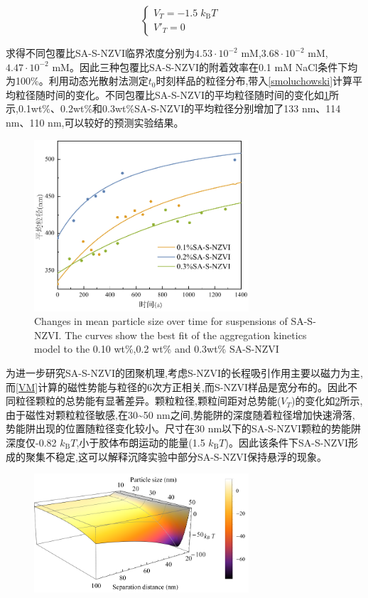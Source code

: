 \begin{equation}
    \left\{
        \begin{array}{lcl} 
            V_T=-1.5\; k_\mathrm{B}T& \\
            V'_T=0 &
        \end{array}\right.
\end{equation}

求得不同包覆比SA-S-NZVI临界浓度分别为$4.53\cdot10^{-2}$ mM,$3.68\cdot10^{-2}$ mM,$4.47 \cdot 10^{-2}$ mM。因此三种包覆比SA-S-NZVI的附着效率在0.1 mM NaCl条件下均为100\%。利用动态光散射法测定$t_0$时刻样品的粒径分布,带入\cref{smoluchowski}计算平均粒径随时间的变化。不同包覆比SA-S-NZVI的平均粒径随时间的变化如\cref{fig2}所示,0.1wt\%、0.2wt\%和0.3wt\%SA-S-NZVI的平均粒径分别增加了133 nm、114 nm、110 nm,可以较好的预测实验结果。

\begin{figure}[h]
    \centering
    \includegraphics[width=8cm]{figs/fig2.pdf}
    \caption{Changes in mean particle size over time for suspensions of SA-S-NZVI. The curves show the best fit of the aggregation kinetics model to the 0.10 wt\%,0.2 wt\% and 0.3wt\% SA-S-NZVI}\label{fig2}
\end{figure}

为进一步研究SA-S-NZVI的团聚机理,考虑S-NZVI的长程吸引作用主要以磁力为主,而\cref{VM}计算的磁性势能与粒径的6次方正相关,而S-NZVI样品是宽分布的。因此不同粒径颗粒的总势能有显著差异。颗粒粒径,颗粒间距对总势能($V_T$)的变化如\cref{fig12}所示,由于磁性对颗粒粒径敏感,在30\textasciitilde50 nm之间,势能阱的深度随着粒径增加快速滑落,势能阱出现的位置随粒径变化较小。尺寸在30 nm以下的SA-S-NZVI颗粒的势能阱深度仅-0.82 $k_\mathrm{B}T$,小于胶体布朗运动的能量(1.5 $k_\mathrm{B}T$)。因此该条件下SA-S-NZVI形成的聚集不稳定,这可以解释沉降实验中部分SA-S-NZVI保持悬浮的现象。

\begin{figure}[h]
    \centering
    \includegraphics[width=8cm]{figs/fig12.pdf}
    \label{fig12}
\end{figure}

